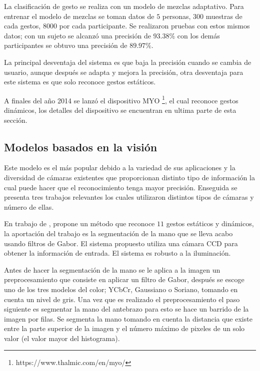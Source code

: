 La clasificación de gesto se realiza con un modelo de mezclas adaptativo. Para entrenar el modelo de mezclas se toman datos de $5$ personas, $300$ muestras de cada gestos, $8000$ por cada participante. Se realizaron pruebas con estos mismos datos; con un sujeto se alcanzó una precisión de $93.38 \%$ con los demás participantes se obtuvo una precisión de $89.97 \%$.  

La principal desventaja del sistema es que baja la precisión cuando se cambia de usuario, aunque después se adapta y mejora la precisión, otra desventaja para este sistema es que solo reconoce gestos estáticos. 

A finales del año 2014 se lanzó el dispositivo MYO \footnote{https://www.thalmic.com/en/myo/}, el cual reconoce gestos dinámicos, los detalles del dispositivo se encuentran en ultima parte de esta sección. 


\subsection{Modelos basados en la visión}   

Este modelo es el más popular debido a la variedad de sus aplicaciones y la diversidad de cámaras existentes que proporcionan distinto tipo de información la cual puede hacer que el reconocimiento tenga mayor precisión. Enseguida se presenta tres  trabajos relevantes los cuales utilizaron distintos tipos de cámaras y número de ellas. 


En trabajo de \citep{Huang2011}, propone un método que reconoce $11$ gestos estáticos y dinámicos, la aportación del trabajo es la segmentación de la mano que se lleva acabo usando filtros de Gabor. El sistema propuesto utiliza una cámara CCD para obtener la información de entrada. El sistema es robusto a la iluminación. 
 
Antes de hacer la segmentación de la mano se le aplica a la imagen un preprocesamiento que consiste en aplicar un filtro de Gabor, después se escoge uno de los tres modelos del color; YCbCr, Gaussiano o Soriano, tomando en cuenta un nivel de gris.  
Una vez que es realizado el preprocesamiento el paso siguiente es segmentar la mano del antebrazo para esto se hace un barrido de la imagen por filas. Se segmenta la mano tomando en cuenta la distancia que existe entre la parte superior de la imagen y el número máximo de pixeles de un solo valor (el valor mayor del histograma).

